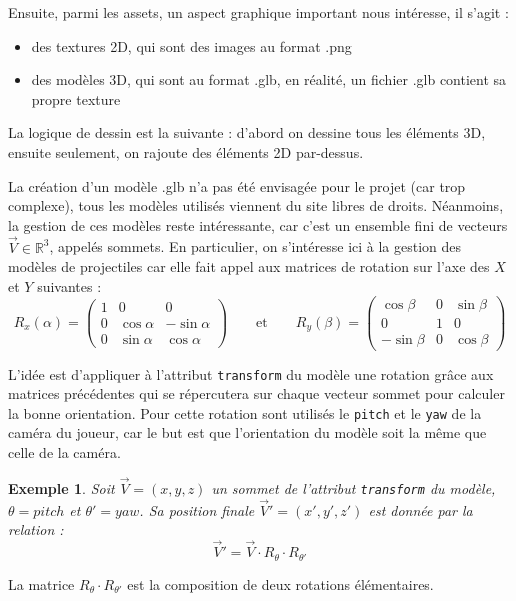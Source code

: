 \documentclass[a4paper,11pt]{article}
\newtheorem{exemple}{Exemple}
\begin{document}
Ensuite, parmi les assets, un aspect graphique important nous intéresse, il s'agit :
\begin{itemize}
    \item des textures 2D, qui sont des images au format .png
    \item des modèles 3D, qui sont au format .glb, en réalité, un fichier .glb contient sa propre texture
\end{itemize}
La logique de dessin est la suivante : d'abord on dessine tous les éléments 3D, ensuite seulement, on rajoute des éléments 2D par-dessus.

La création d'un modèle .glb n'a pas été envisagée pour le projet (car trop complexe), tous les modèles utilisés viennent du site \cite{polypizza} libres de droits. 
Néanmoins, la gestion de ces modèles reste intéressante, car c'est un ensemble fini de vecteurs $\vec{V} \in \mathbb{R}^3$, appelés sommets. En particulier, on s'intéresse ici à la gestion des modèles de projectiles car elle fait appel aux matrices de rotation sur l'axe des $X$ et $Y$ suivantes :
\begin{equation*}
    R_x(\alpha) = \begin{pmatrix} 1 & 0 & 0 \\ 0 & \cos\alpha & -\sin\alpha \\ 0 & \sin\alpha & \cos\alpha \end{pmatrix} 
    \qquad \text{et} \qquad
    R_y(\beta) = \begin{pmatrix} \cos\beta & 0 & \sin\beta \\ 0 & 1 & 0 \\ -\sin\beta & 0 & \cos\beta \end{pmatrix}
\end{equation*}
 
L'idée est d'appliquer à l'attribut \verb|transform| du modèle une rotation grâce aux matrices précédentes qui se répercutera sur chaque vecteur sommet pour calculer la bonne orientation. Pour cette rotation sont utilisés le \verb|pitch| et le \verb|yaw| de la caméra du joueur, car le but est que l'orientation du modèle soit la même que celle de la caméra. 

\begin{exemple}
Soit $\vec{V}=(x,y,z)$ un sommet de l'attribut \verb|transform| du modèle, $\theta=pitch$ et $\theta'=yaw$. Sa position finale $\vec{V}'=(x',y',z')$ est donnée par la relation :
\[
\vec{V}' = \vec{V} \cdot R_{\theta} \cdot R_{\theta'}    
\]
\end{exemple}
La matrice $ R_{\theta} \cdot R_{\theta'}$ est la composition de deux rotations élémentaires.
\end{document}
